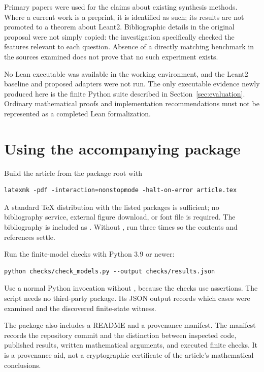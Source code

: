 Primary papers were used for the claims about existing synthesis methods.
Where a current work is a preprint, it is identified as such; its results are
not promoted to a theorem about Leant2. Bibliographic details in the original
proposal were not simply copied: the investigation specifically checked the
features relevant to each question. Absence of a directly matching benchmark
in the sources examined does not prove that no such experiment exists.

No Lean executable was available in the working environment, and the Leant2
baseline and proposed adapters were not run. The only executable evidence
newly produced here is the finite Python suite described in
Section~\ref{sec:evaluation}. Ordinary mathematical proofs and implementation
recommendations must not be represented as a completed Lean formalization.

\section{Using the accompanying package}

Build the article from the package root with
\begin{lstlisting}
latexmk -pdf -interaction=nonstopmode -halt-on-error article.tex
\end{lstlisting}
A standard TeX distribution with the listed packages is sufficient; no
bibliography service, external figure download, or font file is required.
The bibliography is included as . Without ,
run  three times so the contents and references settle.

Run the finite-model checks with Python 3.9 or newer:
\begin{lstlisting}
python checks/check_models.py --output checks/results.json
\end{lstlisting}
Use a normal Python invocation without , because the checks use
assertions. The script needs no third-party package. Its JSON output records
which cases were examined and the discovered finite-state witness.

The package also includes a README and a provenance manifest. The manifest
records the repository commit and the distinction between inspected code,
published results, written mathematical arguments, and executed finite checks.
It is a provenance aid, not a cryptographic certificate of the article's
mathematical conclusions.
